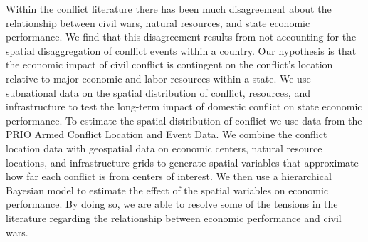 


Within the conflict literature there has been much disagreement about the relationship between civil wars, natural resources, and state economic performance. We find that this disagreement results from not accounting for the spatial disaggregation of conflict events within a country. Our hypothesis is that the economic impact of civil conflict is contingent on the conflict's location relative to major economic and labor resources within a state. We use subnational data on the spatial distribution of conflict, resources, and infrastructure to test the long-term impact of domestic conflict on state economic performance. To estimate the spatial distribution of conflict we use data from the PRIO Armed Conflict Location and Event Data. We combine the conflict location data with geospatial data on economic centers, natural resource locations, and infrastructure grids to generate spatial variables that approximate how far each conflict is from centers of interest. We then use a hierarchical Bayesian model to estimate the effect of the spatial variables on economic performance. By doing so, we are able to resolve some of the tensions in the literature regarding the relationship between economic performance and civil wars. 